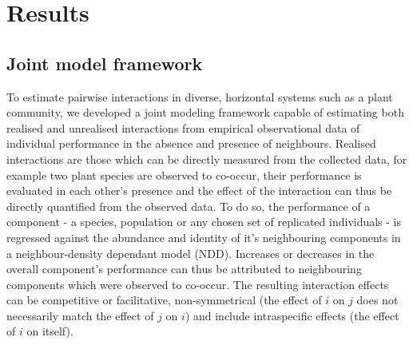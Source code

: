 \documentclass[a4,12pt]{article}
\begin{document}


\section{Results}

    \subsection{Joint model framework}


    To estimate pairwise interactions in diverse, horizontal systems such as a plant community, we developed a joint modeling framework capable of estimating both realised and unrealised interactions from empirical observational data of individual performance in the absence and presence of neighbours. Realised interactions are those which can be directly measured from the collected data, for example two plant species are observed to co-occur, their performance is evaluated in each other's presence and the effect of the interaction can thus be directly quantified from the observed data. To do so, the performance of a component - a species, population or any chosen set of replicated individuals - is regressed against the abundance and identity of it's neighbouring components in a neighbour-density dependant model (NDD). Increases or decreases in the overall component's performance can thus be attributed to neighbouring components which were observed to co-occur. The resulting interaction effects can be competitive or facilitative, non-symmetrical (the effect of $i$ on $j$ does not necessarily match the effect of $j$ on $i$) and include intraspecific effects (the effect of $i$ on itself). 
\end{document}
